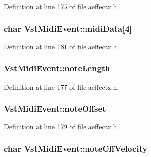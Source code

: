 Definition at line 175 of file aeffectx.\+h.

\subsubsection[{\texorpdfstring{midi\+Data}{midiData}}]{\setlength{\rightskip}{0pt plus 5cm}char Vst\+Midi\+Event\+::midi\+Data\mbox{[}4\mbox{]}}\hypertarget{class_vst_midi_event_a41ed861e773854a165eff6cfcdfd046b}{}\label{class_vst_midi_event_a41ed861e773854a165eff6cfcdfd046b}


Definition at line 181 of file aeffectx.\+h.

\subsubsection[{\texorpdfstring{note\+Length}{noteLength}}]{ Vst\+Midi\+Event\+::note\+Length}\hypertarget{class_vst_midi_event_a7136c3f09bbacfc1b555b935be7de673}{}\label{class_vst_midi_event_a7136c3f09bbacfc1b555b935be7de673}


Definition at line 177 of file aeffectx.\+h.

\subsubsection[{\texorpdfstring{note\+Offset}{noteOffset}}]{ Vst\+Midi\+Event\+::note\+Offset}\hypertarget{class_vst_midi_event_adfec66cba88a281f5dc440708d7793ff}{}\label{class_vst_midi_event_adfec66cba88a281f5dc440708d7793ff}


Definition at line 179 of file aeffectx.\+h.

\subsubsection[{\texorpdfstring{note\+Off\+Velocity}{noteOffVelocity}}]{\setlength{\rightskip}{0pt plus 5cm}char Vst\+Midi\+Event\+::note\+Off\+Velocity}\hypertarget{class_vst_midi_event_a64496ffbdd2c8c261042cd1d7b107438}{}\label{class_vst_midi_event_a64496ffbdd2c8c261042cd1d7b107438}


